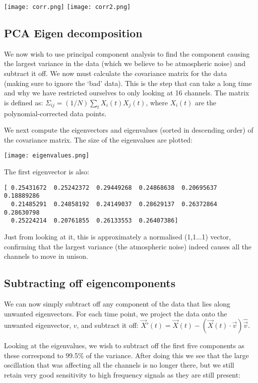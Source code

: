 \documentclass[12pt]{article}
\begin{document}
\begin{center}
\texttt{[image: corr.png]}
\texttt{[image: corr2.png]}
\end{center}

\subsection{PCA Eigen decomposition} 
We now wish to use principal component analysis to find the component causing the largest variance in the data (which we believe to be atmospheric noise) and subtract it off.
We now must calculate the covariance matrix for the data (making sure to ignore the `bad' data).
This is the step that can take a long time and why we have restricted ourselves to only looking at 16 channels.
The matrix is defined as: $\Sigma_{ij} = (1/N) \sum_t X_i(t) X_j(t)$, where $X_i(t)$ are the polynomial-corrected data points.

We next compute the eigenvectors and eigenvalues (sorted in descending order) of the covariance matrix.
The size of the eigenvalues are plotted:

\begin{center}
\texttt{[image: eigenvalues.png]}
\end{center}

The first eigenvector is also:
\begin{verbatim}
[ 0.25431672  0.25242372  0.29449268  0.24868638  0.20695637  0.18889286
  0.21485291  0.24858192  0.24149037  0.28629137  0.26372864  0.28630798
  0.25224214  0.20761855  0.26133553  0.26407386]
\end{verbatim}
Just from looking at it, this is approximately a normalised (1,1...1) vector, confirming that the largest variance (the atmospheric noise) indeed causes all the channels to move in unison.

\subsection{Subtracting off eigencomponents}
We can now simply subtract off any component of the data that lies along unwanted eigenvectors.
For each time point, we project the data onto the unwanted eigenvector, $v$, and subtract it off: $\vec{X}'(t) = \vec{X}(t) - (\vec{X}(t)\cdot\vec{v}) \hat{\vec{v}}$.

Looking at the eigenvalues, we wish to subtract off the first five components as these correspond to 99.5\% of the variance.
After doing this we see that the large oscillation that was affecting all the channels is no longer there, but we still retain very good sensitivity to high frequency signals as they are still present:
\end{document}
